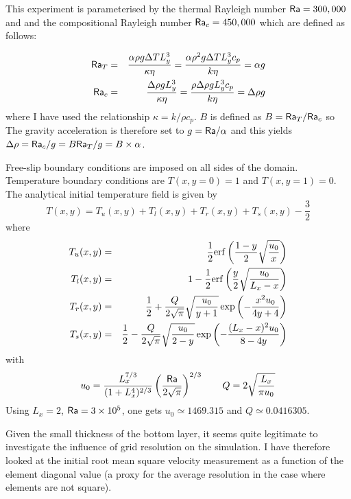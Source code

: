 This experiment is parameterised by the thermal Rayleigh number ${\mathsf{Ra}}=300,000$ and 
and the compositional Rayleigh number ${\mathsf{Ra}}_c=450,000$ which are defined as follows:

\begin{eqnarray}
{\mathsf{Ra}}_T&=&\frac{\alpha \rho g \Delta T L_y^3}{\kappa \eta}
= \frac{\alpha \rho^2 g \Delta T L_y^3 c_p}{k \eta}
= \alpha g \\
{\mathsf{Ra}}_c&=&\frac{ \Delta \rho g L_y^3}{\kappa \eta}
= \frac{ \rho \Delta \rho g L_y^3 c_p}{k \eta}
= \Delta \rho g
\end{eqnarray}
where I have used the relationship $\kappa=k/\rho c_p$.
$B$ is defined as $B={\mathsf{Ra}}_T/{\mathsf{Ra}}_c$ so 
The gravity acceleration is therefore set to $g={\mathsf{Ra}}/\alpha$ and 
this yields $\Delta \rho={\mathsf{Ra}}_c/g=B {\mathsf{Ra}}_T/g = B\times \alpha$.

Free-slip boundary conditions are imposed on all sides of the domain.
Temperature boundary conditions are $T(x,y=0)=1$ and 
$T(x,y=1)=0$. The analytical initial temperature field is given by 
\begin{equation}
T(x,y)=T_u(x,y)+T_l(x,y)+T_r(x,y)+T_s(x,y)-\frac{3}{2}
\end{equation}
where
\begin{eqnarray}
T_u(x,y) &=& \frac{1}{2} {\rm erf} \left(  \frac{1-y}{2} \sqrt{\frac{u_0}{x}} \right) \nonumber\\
T_l(x,y) &=& 1-\frac{1}{2} {\rm erf} \left( \frac{y}{2} \sqrt{\frac{u_0}{L_x-x}} \right) \nonumber\\
T_r(x,y) &=& \frac{1}{2} + \frac{Q}{2\sqrt{\pi}} \sqrt{\frac{u_0}{y+1}} \exp \left(  -\frac{x^2u_0}{4y+4} \right) \nonumber\\
T_s(x,y) &=& \frac{1}{2} - \frac{Q}{2\sqrt{\pi}} \sqrt{\frac{u_0}{2-y}} \exp \left(  -\frac{(L_x-x)^2u_0}{8-4y} \right) 
\end{eqnarray}
with
\begin{equation}
u_0=\frac{L_x^{7/3}}{(1+L_x^4)^{2/3}} \left(\frac{{\mathsf{Ra}}}{2\sqrt{\pi}} \right)^{2/3}
\quad\quad
Q=2\sqrt{\frac{L_x}{\pi u_0}}
\end{equation}
Using $L_x=2$, ${\mathsf{Ra}}=3\times10^5$, one gets
$u_0 \simeq 1469.315 $ and $Q\simeq 0.0416305$.

Given the small thickness of the bottom layer, it seems quite legitimate to 
investigate the influence of grid resolution on the simulation. 
I have therefore looked at the initial root mean square velocity measurement 
as a function of the element diagonal value (a proxy for the average resolution
in the case where elements are not square). 

